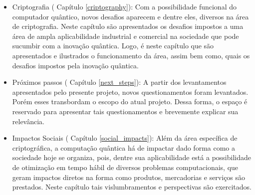 \begin{itemize}
  \item Criptografia ( Capítulo \ref{criptography}): Com a possibilidade funcional do computador quântico, novos desafios aparecem e dentre eles, diversos na área de criptografia. Neste capítulo são apresentados os desafios impostos a uma área de ampla aplicabilidade industrial e comercial na sociedade que pode sucumbir com a inovação quântica. Logo, é neste capítulo que são apresentados e ilustrados o funcionamento da área, assim bem como, quais os desafios impostos pela inovação quântica.
  \item Próximos passos ( Capítulo \ref{next_steps}): A partir dos levantamentos apresentados pelo presente projeto, novos questionamentos foram levantados. Porém esses transbordam o escopo do atual projeto. Dessa forma, o espaço é reservado para apresentar tais questionamentos e brevemente explicar sua relevância.
  \item Impactos Sociais ( Capítulo \ref{social_impacts}): Além da área específica de criptográfica, a computação quântica há de impactar dado forma como a sociedade hoje se organiza, pois, dentre sua aplicabilidade está a possibilidade de otimização em tempo hábil de diversos problemas computacionais, que geram impactos diretos na forma como produtos, mercadorias e serviços são prestados. Neste capítulo tais vislumbramentos e perspectivas são exercitados.
\end{itemize}

\newpage

